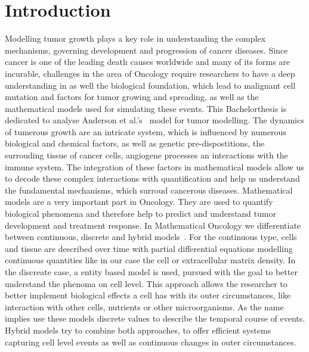 \section{Introduction}
Modelling tumor growth plays a key role in understanding the complex mechanisms, governing development and progression of cancer diseases. Since cancer is one of the leading death causes worldwide and many of its forms are incurable, challenges in the area of Oncology require researchers to have a deep understanding in as well the biological foundation, which lead to malignant cell mutation and factors for tumor growing and spreading, as well as the mathematical models used for simulating these events. This Bachelorthesis is dedicated to analyse Anderson et al.'s~\cite{anderson_continuous_1998,anderson_mathematical_2000} model for tumor modelling.\newline
The dynamics of tumerous growth are an intricate system, which is influenced by numerous biological and chemical factors, as well as genetic pre-dispostitions, the surrouding tissue of cancer cells, angiogene processes an interactions with the immune system. The integration of these factors in mathematical models allow us to decode these complex interactions with quantification and help us understand the fundamental mechanisms, which surroud cancerous diseases. \newline 
Mathematical models are a very important part in Oncology. They are used to quantify biological phenomena and therefore help to predict and understand tumor development and treatment response. In Mathematical Oncology we differentiate between continuous, discrete and hybrid models~\cite{BEKISZ2020101198}. For the continuous type, cells and tissue are described over time with partial differential equations modelling continuous quantities like in our case the cell or extracellular matrix density. In the discreate case, a entity based model is used, pursued with the goal to better understand the phenoma on cell level. This approach allows the researcher to better implement biological effects a cell has with its outer circumstances, like interaction with other cells, nutrients or other microorganisms. As the name implies use these models discrete values to describe the temporal course of events. Hybrid models try to combine both approaches, to offer efficient systems capturing cell level events as well as continuous changes in outer circumstances.\newline 
